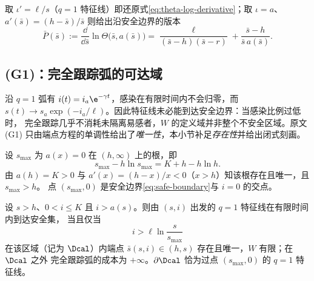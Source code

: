 取 $\iota'=\ell/s$（$q=1$ 特征线）即还原式\eqref{eq:theta-log-derivative}；取 $\iota=a$、
$a'(\bar s)=(h-\bar s)/\bar s$ 则给出沿安全边界的版本
\begin{equation}
\bar P(\bar s):=\frac{\dd}{\dd\bar s}\ln\Theta\bigl(\bar s,a(\bar s)\bigr)
=\frac{\ell}{(\bar s-h)(\bar s-r)}+\frac{\bar s-h}{\bar s\,a(\bar s)} .
\label{eq:Pbar}
\end{equation}

\subsection{(G1)：完全跟踪弧的可达域}
\label{sec:G1}

沿 $q=1$ 弧有 $i(t)=i_a\e^{-\gamma t}$，感染在有限时间内不会归零，而
$s(t)\to s_a\exp(-i_a/\ell)$。因此特征线未必能到达安全边界：当感染比例过低时，
完全跟踪几乎不消耗未隔离易感者，$W$ 的定义域并非整个不安全区域。原文
(G1) 只由端点方程的单调性给出了\emph{唯一性}，本小节补足\emph{存在性}并给出闭式刻画。

\begin{definition}[安全边界的端点]
设 $s_{\max}$ 为 $a(x)=0$ 在 $(h,\infty)$ 上的根，即
\begin{equation}
s_{\max}-h\ln s_{\max}=K+h-h\ln h .
\label{eq:smax}
\end{equation}
由 $a(h)=K>0$ 与 $a'(x)=(h-x)/x<0$（$x>h$）知该根存在且唯一，且 $s_{\max}>h$。
点 $(s_{\max},0)$ 是安全边界\eqref{eq:safe-boundary}与 $i=0$ 的交点。
\end{definition}

\begin{proposition}[可达域的闭式刻画]
\label{prop:reachable}
设 $s>h$、$0<i\le K$ 且 $i>a(s)$。则由 $(s,i)$ 出发的 $q=1$ 特征线在有限时间内到达安全集，
当且仅当
\begin{equation}
\boxed{\;i>\ell\ln\frac{s}{s_{\max}}\;}
\label{eq:reachable}
\end{equation}
在该区域（记为 $\Dcal$）内端点 $\bar s(s,i)\in(h,s)$ 存在且唯一，$W$ 有限；在 $\Dcal$ 之外
完全跟踪弧的成本为 $+\infty$。$\partial\Dcal$ 恰为过点 $(s_{\max},0)$ 的 $q=1$ 特征线。
\end{proposition}

